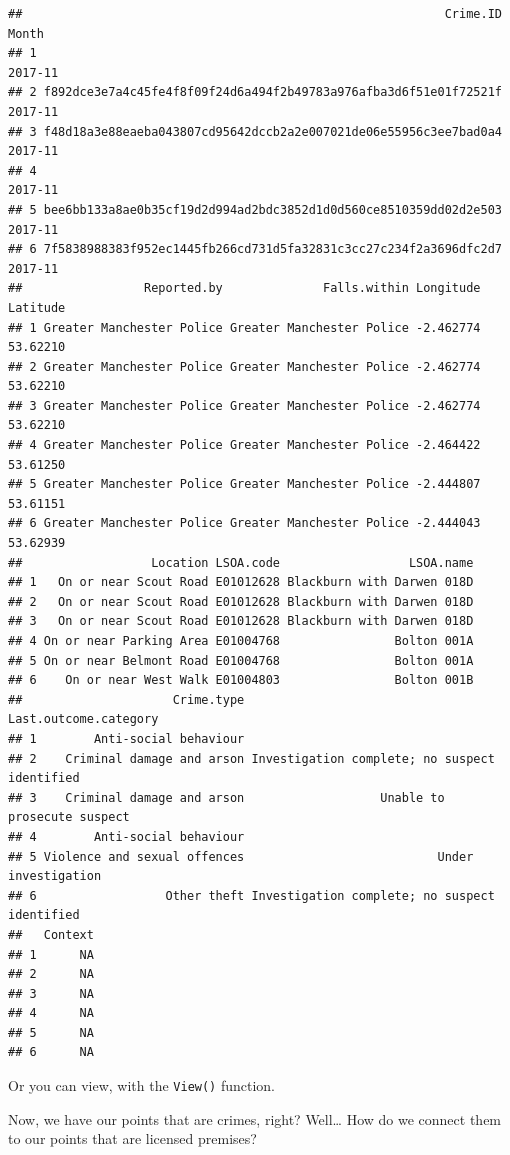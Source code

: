 \documentclass[]{book}
\begin{document}
\begin{verbatim}
##                                                           Crime.ID   Month
## 1                                                                  2017-11
## 2 f892dce3e7a4c45fe4f8f09f24d6a494f2b49783a976afba3d6f51e01f72521f 2017-11
## 3 f48d18a3e88eaeba043807cd95642dccb2a2e007021de06e55956c3ee7bad0a4 2017-11
## 4                                                                  2017-11
## 5 bee6bb133a8ae0b35cf19d2d994ad2bdc3852d1d0d560ce8510359dd02d2e503 2017-11
## 6 7f5838988383f952ec1445fb266cd731d5fa32831c3cc27c234f2a3696dfc2d7 2017-11
##                 Reported.by              Falls.within Longitude Latitude
## 1 Greater Manchester Police Greater Manchester Police -2.462774 53.62210
## 2 Greater Manchester Police Greater Manchester Police -2.462774 53.62210
## 3 Greater Manchester Police Greater Manchester Police -2.462774 53.62210
## 4 Greater Manchester Police Greater Manchester Police -2.464422 53.61250
## 5 Greater Manchester Police Greater Manchester Police -2.444807 53.61151
## 6 Greater Manchester Police Greater Manchester Police -2.444043 53.62939
##                  Location LSOA.code                  LSOA.name
## 1   On or near Scout Road E01012628 Blackburn with Darwen 018D
## 2   On or near Scout Road E01012628 Blackburn with Darwen 018D
## 3   On or near Scout Road E01012628 Blackburn with Darwen 018D
## 4 On or near Parking Area E01004768                Bolton 001A
## 5 On or near Belmont Road E01004768                Bolton 001A
## 6    On or near West Walk E01004803                Bolton 001B
##                     Crime.type                         Last.outcome.category
## 1        Anti-social behaviour                                              
## 2    Criminal damage and arson Investigation complete; no suspect identified
## 3    Criminal damage and arson                   Unable to prosecute suspect
## 4        Anti-social behaviour                                              
## 5 Violence and sexual offences                           Under investigation
## 6                  Other theft Investigation complete; no suspect identified
##   Context
## 1      NA
## 2      NA
## 3      NA
## 4      NA
## 5      NA
## 6      NA
\end{verbatim}

Or you can view, with the \texttt{View()} function.

Now, we have our points that are crimes, right? Well\ldots{} How do we connect them to our points that are licensed premises?
\end{document}
